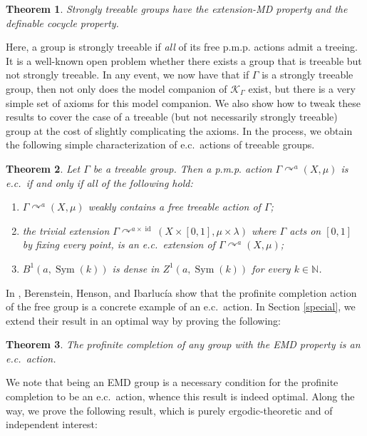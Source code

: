 \documentclass[12pt]{amsart}
\newtheorem*{thm*}{Theorem}
\theoremstyle{definition}
\def\bb{\mathbb}
\def\bb{\mathbb}
\DeclareMathOperator{\id}{id}
\newcommand{\pmp}{p{$.$}m{$.$}p{$.$}}
\newcommand{\acts}{\curvearrowright}
\begin{document}
\begin{thm*}
Strongly treeable groups have the extension-MD property and the definable cocycle property.
\end{thm*}  

Here, a group is strongly treeable if \emph{all} of its free {\pmp} actions admit a treeing.  
It is a well-known open problem whether there exists a group that is treeable but not strongly treeable.  In any event, we now have that if $\Gamma$ is a strongly treeable group, then not only does the model companion of $\mathcal{K}_\Gamma$ exist, but there is a very simple set of axioms for this model companion.  We also show how to tweak these results to cover the case of a treeable (but not necessarily strongly treeable) group at the cost of slightly complicating the axioms. In the process, we obtain the following simple characterization of e.c.\ actions of treeable groups.

\begin{thm*}
	Let $\Gamma$ be a treeable group. Then a {\pmp} action $\Gamma \acts^a (X, \mu)$ is e.c.\ if and only if all of the following hold:
	\begin{enumerate}
		\item $\Gamma \acts^a (X, \mu)$ weakly contains a free treeable action of $\Gamma$;
		\item the trivial extension $\Gamma \acts^{a \times \id} (X \times [0,1], \mu \times \lambda)$ where $\Gamma$ acts on $[0,1]$ by fixing every point, is an e.c.\ extension of $\Gamma \acts^a (X, \mu)$;
		\item $B^1(a, \operatorname{Sym}(k))$ is dense in $Z^1(a, \operatorname{Sym}(k))$ for every $k \in \bb N$.
	\end{enumerate}
\end{thm*}

In \cite{BIH}, Berenstein, Henson, and Ibarluc\'ia show that the profinite completion action of the free group is a concrete example of an e.c.\ action.  In Section \ref{special}, we extend their result in an optimal way by proving the following:

\begin{thm*}
The profinite completion of any group with the EMD property is an e.c.\ action. 
\end{thm*}

  We note that being an EMD group is a necessary condition for the profinite completion to be an e.c.\ action, whence this result is indeed optimal.  Along the way, we prove the following result, which is purely ergodic-theoretic and of independent interest:
\end{document}
